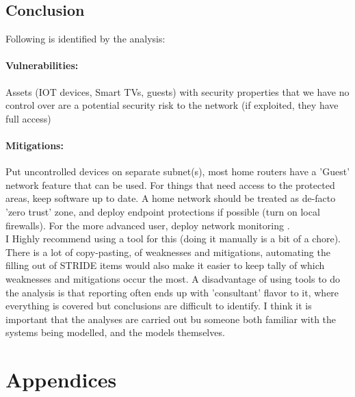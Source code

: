 \documentclass[
	letterpaper, %
	10pt, %
	unnumberedsections, %
	twoside, %
]{APAAssignment}
\begin{document}
\section{Conclusion}
Following is identified by the analysis: 

\subsubsection{Vulnerabilities:} 
Assets (IOT devices, Smart TVs, guests) with security properties that we have no control over are a potential security risk to the network (if exploited, they have full access)

\subsubsection{Mitigations:} 
Put uncontrolled devices on separate subnet(s), most home routers have a 'Guest' network feature that can be used. For things that need access to the protected areas, keep software up to date. A home network should be treated as de-facto 'zero trust' zone, and deploy endpoint protections if possible (turn on local firewalls). For the more advanced user, deploy network monitoring . \\ 
 
I Highly recommend using a tool for this (doing it manually is a bit of a chore). There is a lot of copy-pasting, of weaknesses and mitigations, automating the filling out of STRIDE items would also make it easier to keep tally of which weaknesses and mitigations occur the most. A disadvantage of using tools to do the analysis is that reporting often ends up with 'consultant' flavor to it, where everything is covered but conclusions are difficult to identify. I think it is important that the analyses are carried out bu someone both familiar with the systems being modelled, and the models themselves.

\clearpage
\printbibliography %





\appendix


\clearpage
\chapter{Appendices}
\begin{appendices}

\end{appendices}
\end{document}
